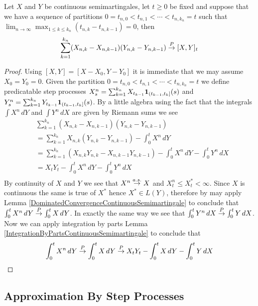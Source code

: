 \begin{lem}\label{ApproximateOptionalQuadraticCovariationContinuousSemimartingale}Let $X$ and $Y$ be continuous semimartingales, let $t \geq 0$ be fixed and suppose that we have a sequence of partitions $0=t_{n,0} < t_{n,1} < \dotsb < t_{n, k_n}=t$ such that $\lim_{n \to \infty} \max_{1 \leq k \leq k_n} (t_{n,k} - t_{n, k-1}) = 0$, then 
\begin{align*}
\sum_{k=1}^{k_n} (X_{n,k} - X_{n,k-1}) (Y_{n,k} - Y_{n,k-1}) \overset{P}\to [X,Y]_t
\end{align*}
\end{lem}
\begin{proof}
Using $[X,Y] = [X-X_0, Y-Y_0]$ it is immediate that we may assume $X_0 = Y_0 = 0$.  Given the partition $0=t_{n,0} < t_{n,1} < \dotsb < t_{n, k_n}=t$ we define predicatable step processes $X^n_s = \sum_{k=1}^{k_n} X_{t_{k-1}} \textbf{1}_{(t_{k-1}, t_k]}(s)$ and $Y^n_s = \sum_{k=1}^{k_n} Y_{t_{k-1}} \textbf{1}_{(t_{k-1}, t_k]}(s)$.  By a little algebra using the fact that the integrals $\int X^n \, dY$ and $\int Y^n \, dX$ are given by Riemann sums we see
\begin{align*}
&\sum_{k=1}^{k_n} (X_{n,k} - X_{n,k-1}) (Y_{n,k} - Y_{n,k-1}) \\
&= \sum_{k=1}^{k_n} X_{n,k} (Y_{n,k} - Y_{n,k-1})  - \int_0^t X^n \, dY \\
&= \sum_{k=1}^{k_n}( X_{n,k} Y_{n,k} - X_{n,k-1} Y_{n,k-1})  - \int_0^t X^n \, dY - \int_0^t Y^n \, dX \\
&= X_t Y_t - \int_0^t X^n \, dY - \int_0^t Y^n \, dX \\
\end{align*}
By continuity of $X$ and $Y$ we see that $X^n \overset{a.s.}\to X$ and $X^n_t\leq X^*_t< \infty$.  Since $X$ is continuous the same is true of $X^*$ hence $X^* \in L(Y)$, therefore by may apply Lemma \ref{DominatedConvergenceContinuousSemimartingale} to conclude that $\int_0^t X^n \, dY \overset{P}\to \int_0^t X \, dY$.  In exactly the same way we see that $\int_0^t Y^n \, dX \overset{P}\to \int_0^t Y \, dX$.  Now we can apply integration by parts Lemma \ref{IntegrationByPartsContinuousSemimartingale} to conclude that 
\begin{align*}
\int_0^t X^n \, dY \overset{P}\to \int_0^t X \, dY \overset{P}\to X_t Y_t - \int_0^t X \, dY - \int_0^t Y \, dX 
\end{align*}
\end{proof}

\subsection{Approximation By Step Processes}

